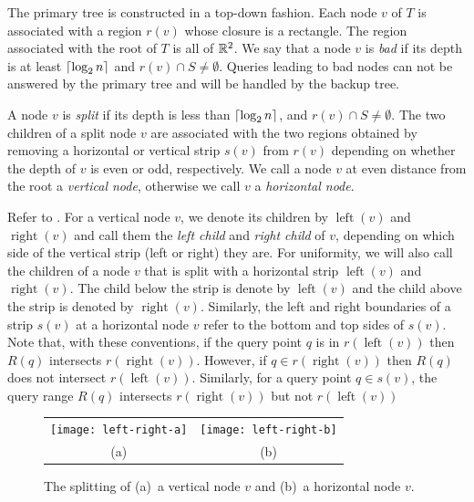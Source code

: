 \documentclass{patmorin}
\DeclareMathOperator{\lft}{left}
\DeclareMathOperator{\rght}{right}
\begin{document}
The primary tree is constructed in a top-down fashion.  Each node $v$
of $T$ is associated with a region $r(v)$ whose closure is a rectangle.
The region associated with the root of $T$ is all of $\mathbb{R}^2$.  We say
that a node $v$ is \emph{bad} if its depth is at least $\left\lceil \log_2 n \right\rceil$
and $r(v)\cap S \neq \emptyset$.  Queries leading to bad nodes can not
be answered by the primary tree and will be handled by the backup tree.

A node $v$ is \emph{split} if its depth is less than $\left\lceil \log_2 n \right\rceil$,
and $r(v)\cap S\neq \emptyset$.  The two children of a split node $v$
are associated with the two regions obtained by removing a horizontal or
vertical strip $s(v)$ from $r(v)$ depending on whether the depth of $v$
is even or odd, respectively.  We call a node $v$ at even distance from
the root a \emph{vertical node}, otherwise we call $v$ a \emph{horizontal
node}.

Refer to .  For a vertical node $v$, we denote its
children by $\lft(v)$ and $\rght(v)$ and call them the \emph{left child}
and \emph{right child} of $v$, depending on which side of the vertical
strip (left or right) they are.  For uniformity, we will also call the
children of a node $v$ that is split with a horizontal strip $\lft(v)$ and
$\rght(v)$.  The child below the strip is denote by $\lft(v)$ and the child
above the strip is denoted by $\rght(v)$.  Similarly, the left and right
boundaries of a strip $s(v)$ at a horizontal node $v$ refer to the bottom
and top sides of $s(v)$.  Note that, with these conventions, if the query
point $q$ is in $r(\lft(v))$ then $R(q)$ intersects $r(\rght(v))$.
However, if $q\in r(\rght(v))$ then $R(q)$ does not intersect $r(\lft(v))$.
Similarly, for a query point $q\in s(v)$, the query range $R(q)$ intersects
$r(\rght(v))$ but not $r(\lft(v))$

\begin{figure}
  \begin{center}
    \begin{tabular}{cc}
      \texttt{[image: left-right-a]} & \texttt{[image: left-right-b]} \\
      (a) & (b)
    \end{tabular}
  \end{center}
  \caption{The splitting of (a)~a vertical node $v$ and (b)~a horizontal
  node $v$.}
\end{figure}
\end{document}
